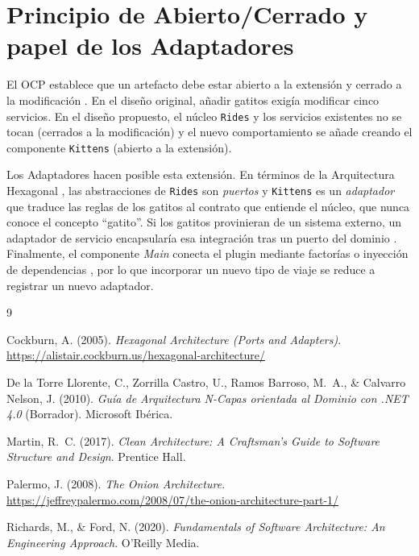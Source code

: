 \documentclass[11pt,a4paper]{article}
\begin{document}
\section{Principio de Abierto/Cerrado y papel de los Adaptadores}

El OCP establece que un artefacto debe estar abierto a la extensión y cerrado a
la modificación \citep{martin2017}. En el diseño original, añadir gatitos
exigía modificar cinco servicios. En el diseño propuesto, el núcleo
\texttt{Rides} y los servicios existentes no se tocan (cerrados a la
modificación) y el nuevo comportamiento se añade creando el componente
\texttt{Kittens} (abierto a la extensión).

Los Adaptadores hacen posible esta extensión. En términos de la Arquitectura
Hexagonal \citep{cockburn2005}, las abstracciones de \texttt{Rides} son
\emph{puertos} y \texttt{Kittens} es un \emph{adaptador} que traduce las reglas
de los gatitos al contrato que entiende el núcleo, que nunca conoce el concepto
``gatito''. Si los gatitos provinieran de un sistema externo, un adaptador de
servicio encapsularía esa integración tras un puerto del dominio
\citep{delatorre2010}. Finalmente, el componente \textit{Main} conecta el plugin
mediante factorías o inyección de dependencias \citep{martin2017}, por lo que
incorporar un nuevo tipo de viaje se reduce a registrar un nuevo adaptador.

\begin{thebibliography}{9}

Cockburn, A. (2005). \textit{Hexagonal Architecture (Ports and Adapters)}.
\url{https://alistair.cockburn.us/hexagonal-architecture/}

De la Torre Llorente, C., Zorrilla Castro, U., Ramos Barroso, M.~A., \&
Calvarro Nelson, J. (2010). \textit{Guía de Arquitectura N-Capas orientada al
Dominio con .NET 4.0} (Borrador). Microsoft Ibérica.

Martin, R.~C. (2017). \textit{Clean Architecture: A Craftsman's Guide to
Software Structure and Design}. Prentice Hall.

Palermo, J. (2008). \textit{The Onion Architecture}.
\url{https://jeffreypalermo.com/2008/07/the-onion-architecture-part-1/}

Richards, M., \& Ford, N. (2020). \textit{Fundamentals of Software Architecture:
An Engineering Approach}. O'Reilly Media.

\end{thebibliography}
\end{document}

